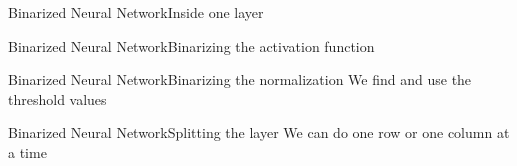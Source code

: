 \documentclass[10pt]{beamer}
\begin{document}
\begin{frame}{Binarized Neural Network}{Inside one layer}
\end{frame}

\begin{frame}{Binarized Neural Network}{Binarizing the activation function}
\end{frame}

\begin{frame}{Binarized Neural Network}{Binarizing the normalization}
We find and use the threshold values
\end{frame}

\begin{frame}{Binarized Neural Network}{Splitting the layer}
We can do one row or one column at a time
\end{frame}
\end{document}
